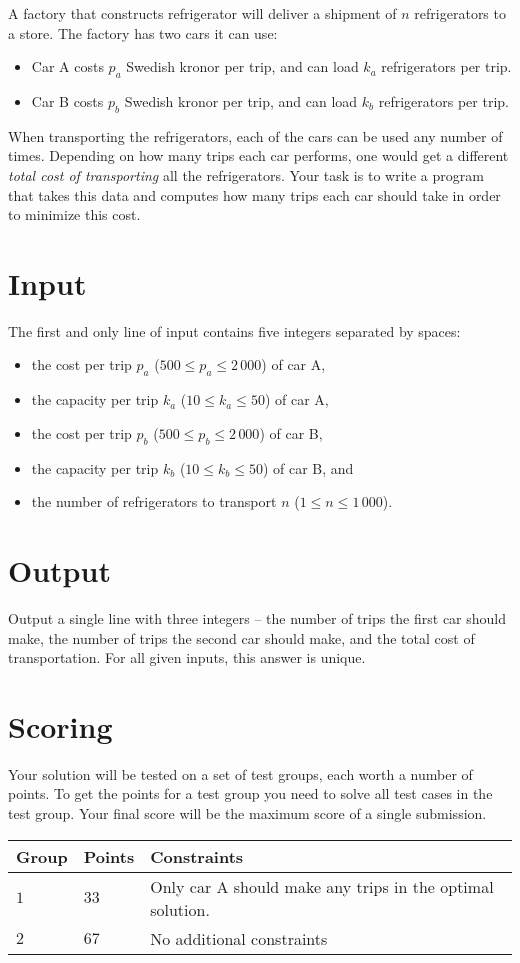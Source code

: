 A factory that constructs refrigerator will deliver a shipment of $n$ refrigerators to a store.
The factory has two cars it can use:
\begin{itemize}
    \item Car A costs $p_a$ Swedish kronor per trip, and can load $k_a$ refrigerators per trip.
    \item Car B costs $p_b$ Swedish kronor per trip, and can load $k_b$ refrigerators per trip.
\end{itemize}

When transporting the refrigerators, each of the cars can be used any number of times.
Depending on how many trips each car performs, one would get a different \emph{total cost of transporting} all the refrigerators.
Your task is to write a program that takes this data and computes how many trips each car should take in order to minimize this cost.

\section*{Input}
The first and only line of input contains five integers separated by spaces:

\begin{itemize}
    \item the cost per trip $p_a$ ($500 \le p_a \le 2\,000$) of car A,
    \item the capacity per trip $k_a$ ($10 \le k_a \le 50$) of car A,
    \item the cost per trip $p_b$ ($500 \le p_b \le 2\,000$) of car B,
    \item the capacity per trip $k_b$ ($10 \le k_b \le 50$) of car B, and
    \item the number of refrigerators to transport $n$ ($1 \le n \le 1\,000$).
\end{itemize}

\section*{Output}
Output a single line with three integers -- the number of trips the first car should make, the number of trips the second car should make, and the total cost of transportation.
For all given inputs, this answer is unique.

\section*{Scoring}
Your solution will be tested on a set of test groups, each worth a number of points.
To get the points for a test group you need to solve all test cases in the test group. Your final score will be the maximum score of a single submission.

\noindent
\begin{tabular}{| l | l | l |}
  \hline
  Group & Points & Constraints \\ \hline
  $1$    & $33$        &  Only car A should make any trips in the optimal solution. \\ \hline
  $2$    & $67$        &  No additional constraints \\ \hline
\end{tabular}

